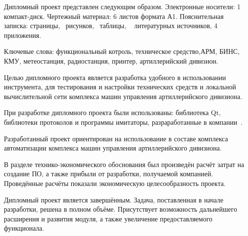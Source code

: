 \thispagestyle{empty}

Дипломный проект представлен следующим образом. Электронные
носители: 1 компакт-диск. Чертежный материал: 6 листов формата А1.
Пояснительная записка: \pageref*{LastPage} страницы, \totfig{}~рисунков, \tottab{}~таблицы, \totref{}~
литературных источников, 4 приложения.

Ключевые слова: функциональный котроль, техническое средство,\break АРМ, БИНС, КМУ, метеостанция, радиостанция, принтер, артиллерийский дивизион.

Целью дипломного проекта является разработка удобного в использовании инструмента, для тестирования и настройки
технических средств и локальной вычислительной сети комплекса машин управления артиллерийского дивизиона.

При разработке дипломного проекта были использованы: библиотека Qt, библиотеки протоколов и программы имитаторы, разраработанные в
компании~\company.

Разработанный проект ориентирован на использование в составе комплекса автоматизации комплекса машин управления
артиллерийского дивизиона.

В разделе технико-экономического обоснования был произведён расчёт затрат на создание ПО, а также прибыли от разработки,
получаемой компанией.
Проведённые расчёты показали экономическую целесообразность проекта.

Дипломный проект является завершённым. Задача, поставленная в
начале разработки, решена в полном объёме. Присутствует возможность
дальнейшего расширения и развития модуля, а также увеличение
предоставляемого функционала.

\clearpage
